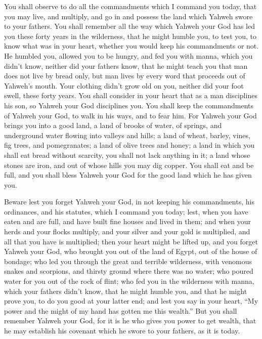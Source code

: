  You shall observe to do all the commandments which I
command you today, that you may live, and multiply, and go in and
possess the land which Yahweh swore to your fathers.  You
shall remember all the way which Yahweh your God has led you these forty
years in the wilderness, that he might humble you, to test you, to know
what was in your heart, whether you would keep his commandments or not.
 He humbled you, allowed you to be hungry, and fed you with
manna, which you didn't know, neither did your fathers know, that he
might teach you that man does not live by bread only, but man lives by
every word that proceeds out of Yahweh's mouth.  Your
clothing didn't grow old on you, neither did your foot swell, these
forty years.  You shall consider in your heart that as a man
disciplines his son, so Yahweh your God disciplines you. 
You shall keep the commandments of Yahweh your God, to walk in his ways,
and to fear him.  For Yahweh your God brings you into a good
land, a land of brooks of water, of springs, and underground water
flowing into valleys and hills;  a land of wheat, barley,
vines, fig trees, and pomegranates; a land of olive trees and honey;
 a land in which you shall eat bread without scarcity, you
shall not lack anything in it; a land whose stones are iron, and out of
whose hills you may dig copper.  You shall eat and be full,
and you shall bless Yahweh your God for the good land which he has given
you.

 Beware lest you forget Yahweh your God, in not keeping his
commandments, his ordinances, and his statutes, which I command you
today;  lest, when you have eaten and are full, and have
built fine houses and lived in them;  and when your herds
and your flocks multiply, and your silver and your gold is multiplied,
and all that you have is multiplied;  then your heart might
be lifted up, and you forget Yahweh your God, who brought you out of the
land of Egypt, out of the house of bondage;  who led you
through the great and terrible wilderness, with venomous snakes and
scorpions, and thirsty ground where there was no water; who poured water
for you out of the rock of flint;  who fed you in the
wilderness with manna, which your fathers didn't know, that he might
humble you, and that he might prove you, to do you good at your latter
end;  and lest you say in your heart, ``My power and the
might of my hand has gotten me this wealth.''  But you
shall remember Yahweh your God, for it is he who gives you power to get
wealth, that he may establish his covenant which he swore to your
fathers, as it is today.

